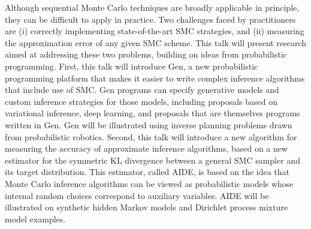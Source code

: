 Although sequential Monte Carlo techniques are broadly applicable in principle, they can be difficult to apply in practice. Two challenges faced by practitioners are (i) correctly implementing state-of-the-art SMC strategies, and (ii) measuring the approximation error of any given SMC scheme. This talk will present research aimed at addressing these two problems, building on ideas from probabilistic programming. First, this talk will introduce Gen, a new probabilistic programming platform that makes it easier to write complex inference algorithms that include use of SMC. Gen programs can specify generative models and custom inference strategies for those models, including proposals based on variational inference, deep learning, and proposals that are themselves programs written in Gen. Gen will be illustrated using inverse planning problems drawn from probabilistic robotics. Second, this talk will introduce a new algorithm for measuring the accuracy of approximate inference algorithms, based on a new estimator for the symmetric KL divergence between a general SMC sampler and its target distribution. This estimator, called AIDE, is based on the idea that Monte Carlo inference algorithms can be viewed as probabilistic models whose internal random choices correspond to auxiliary variables. AIDE will be illustrated on synthetic hidden Markov models and Dirichlet process mixture model examples.